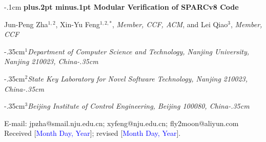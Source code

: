 \documentclass[twoside]{article}
\def\title#1{\vspace{3mm}\begin{flushleft}\vglue-.1cm\Large\bf\boldmath\protect\baselineskip=18pt plus.2pt minus.1pt #1
\end{flushleft}\vspace{1mm} }
\def\author#1{\begin{flushleft}\normalsize #1\end{flushleft}\vspace*{-4pt} \vspace{3mm}}
\def\address#1#2{\begin{flushleft}\vglue-.35cm${}^{#1}$\small\it #2\vglue-.35cm\end{flushleft}\vspace{-2mm}\par}
\begin{document}
\begin{CJK*}{GBK}{song}
\thispagestyle{empty}
\vspace*{-13mm}
\vspace*{2mm}

\title{Modular Verification of SPARCv8 Code}

\author{Jun-Peng Zha$^{1,2}$, Xin-Yu Feng$^{1,2,*}$, \textit{Member, CCF, ACM}, 
  and Lei Qiao$^{3}$, \textit{Member, CCF}}

\address{1}{Department of Computer Science and Technology, Nanjing University, Nanjing 210023, China}
\address{2}{State Key Laboratory for Novel Software Technology, Nanjing 210023, China}
\address{3}{Beijing Institute of Control Engineering, Beijing 100080, China}

\vspace{2mm}

\noindent E-mail: jpzha@smail.nju.edu.cn; xyfeng@nju.edu.cn;
fly2moon@aliyun.com  \\[-1mm]





\noindent Received [\textcolor{blue}{Month Day, Year}]; revised [\textcolor{blue}{Month Day, Year}].\\[1mm]


\end{CJK*}
\end{document}
